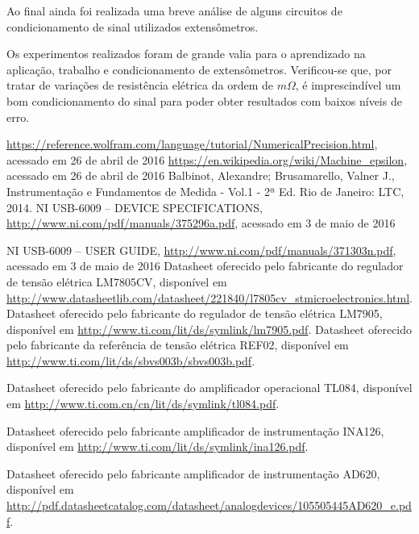 \documentclass[a4paper]{instrumentacao}
\begin{document}
Ao final ainda foi realizada uma breve análise de alguns circuitos de condicionamento de sinal utilizados extensômetros.

Os experimentos realizados foram de grande valia para o aprendizado na aplicação, trabalho e condicionamento de extensômetros. Verificou-se que, por tratar de variações de resistência elétrica da ordem de $m\Omega$, é imprescindível um bom condicionamento do sinal para poder obter resultados com baixos níveis de erro. 

\newpage

\begin{thebibliography}{9}
 \url{https://reference.wolfram.com/language/tutorial/NumericalPrecision.html}, acessado em 26 de abril de 2016
 \url{https://en.wikipedia.org/wiki/Machine_epsilon}, acessado em 26 de abril de 2016
  Balbinot, Alexandre; Brusamarello, Valner J., Instrumentação e Fundamentos de Medida - Vol.1 - 2ª Ed. Rio de Janeiro: LTC, 2014.
 NI USB-6009 -- DEVICE SPECIFICATIONS, \url{http://www.ni.com/pdf/manuals/375296a.pdf}, acessado em 3 de maio de 2016

 NI USB-6009 -- USER GUIDE, \url{http://www.ni.com/pdf/manuals/371303n.pdf}, acessado em 3 de maio de 2016
 Datasheet oferecido pelo fabricante do regulador de tensão elétrica LM7805CV, disponível em \url{http://www.datasheetlib.com/datasheet/221840/l7805cv_stmicroelectronics.html}.
 Datasheet oferecido pelo fabricante do regulador de tensão elétrica LM7905, disponível em \url{http://www.ti.com/lit/ds/symlink/lm7905.pdf}.
 Datasheet oferecido pelo fabricante da referência de tensão elétrica REF02, disponível em \url{http://www.ti.com/lit/ds/sbvs003b/sbvs003b.pdf}.

 Datasheet oferecido pelo fabricante do amplificador operacional TL084, disponível em \url{http://www.ti.com.cn/cn/lit/ds/symlink/tl084.pdf}.

 Datasheet oferecido pelo fabricante amplificador de instrumentação INA126, disponível em \url{http://www.ti.com/lit/ds/symlink/ina126.pdf}.

 Datasheet oferecido pelo fabricante amplificador de instrumentação AD620, disponível em \url{http://pdf.datasheetcatalog.com/datasheet/analogdevices/105505445AD620_e.pdf}.


\end{thebibliography}
\end{document}
